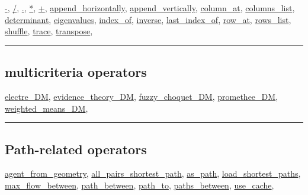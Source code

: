 \documentclass[]{book}
\theoremstyle{definition}
\theoremstyle{definition}
\theoremstyle{definition}
\theoremstyle{remark}
\begin{document}
\href{operators-a-to-a.html\#-}{-}, \href{operators-a-to-a.html\#/}{/},
\href{operators-a-to-a.html\#.}{.}, \href{operators-a-to-a.html\#*}{*},
\href{operators-a-to-a.html\#+}{+},
\href{operators-a-to-a.html\#append_horizontally}{append\_horizontally},
\href{operators-a-to-a.html\#append_vertically}{append\_vertically},
\href{operators-b-to-c.html\#column_at}{column\_at},
\href{operators-b-to-c.html\#columns_list}{columns\_list},
\href{operators-d-to-h.html\#determinant}{determinant},
\href{operators-d-to-h.html\#eigenvalues}{eigenvalues},
\href{operators-i-to-m.html\#index_of}{index\_of},
\href{operators-i-to-m.html\#inverse}{inverse},
\href{operators-i-to-m.html\#last_index_of}{last\_index\_of},
\href{operators-n-to-r.html\#row_at}{row\_at},
\href{operators-n-to-r.html\#rows_list}{rows\_list},
\href{operators-s-to-z.html\#shuffle}{shuffle},
\href{operators-s-to-z.html\#trace}{trace},
\href{operators-s-to-z.html\#transpose}{transpose},

\begin{center}\rule{0.5\linewidth}{\linethickness}\end{center}

\subsection{multicriteria operators}\label{multicriteria-operators}

\href{operators-d-to-h.html\#electre_dm}{electre\_DM},
\href{operators-d-to-h.html\#evidence_theory_dm}{evidence\_theory\_DM},
\href{operators-d-to-h.html\#fuzzy_choquet_dm}{fuzzy\_choquet\_DM},
\href{operators-n-to-r.html\#promethee_dm}{promethee\_DM},
\href{operators-s-to-z.html\#weighted_means_dm}{weighted\_means\_DM},

\begin{center}\rule{0.5\linewidth}{\linethickness}\end{center}

\subsection{Path-related operators}\label{path-related-operators}

\href{operators-a-to-a.html\#agent_from_geometry}{agent\_from\_geometry},
\href{operators-a-to-a.html\#all_pairs_shortest_path}{all\_pairs\_shortest\_path},
\href{operators-a-to-a.html\#as_path}{as\_path},
\href{operators-i-to-m.html\#load_shortest_paths}{load\_shortest\_paths},
\href{operators-i-to-m.html\#max_flow_between}{max\_flow\_between},
\href{operators-n-to-r.html\#path_between}{path\_between},
\href{operators-n-to-r.html\#path_to}{path\_to},
\href{operators-n-to-r.html\#paths_between}{paths\_between},
\href{operators-s-to-z.html\#use_cache}{use\_cache},
\end{document}
